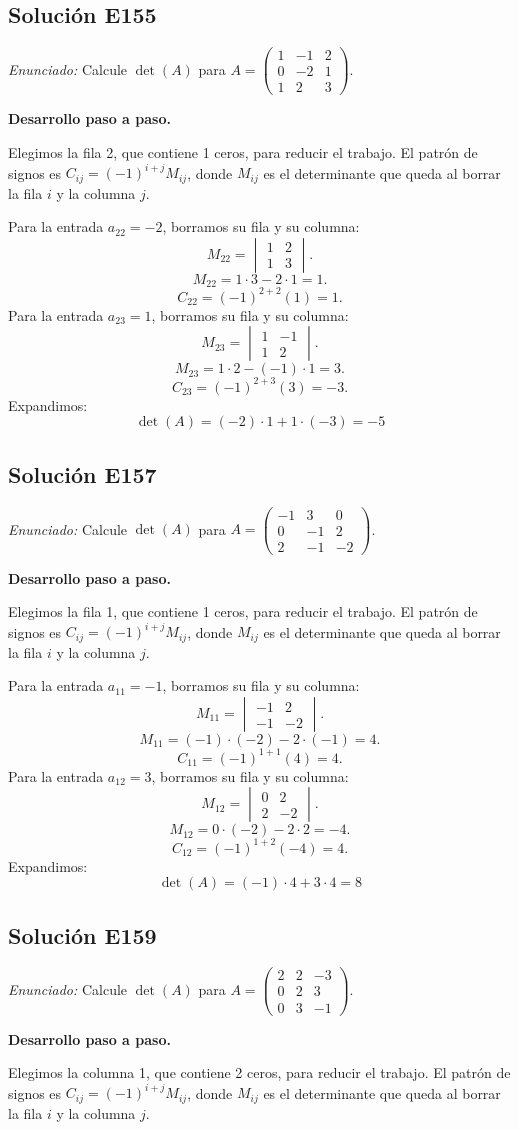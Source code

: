 \documentclass[12pt]{article}
\theoremstyle{remark}
\newcommand{\solucion}[2]{\Needspace{11\baselineskip}\subsection*{Solución E#1}\noindent\textit{Enunciado:} #2\par\medskip\noindent\textbf{Desarrollo paso a paso.}\par\medskip}
\begin{document}
\medskip

\solucion{155}{Calcule $\det(A)$ para $A=\begin{pmatrix}1&-1&2\\0&-2&1\\1&2&3\end{pmatrix}$.}
Elegimos la fila 2, que contiene 1 ceros, para reducir el trabajo. El patrón de signos es $C_{ij}=(-1)^{i+j}M_{ij}$, donde $M_{ij}$ es el determinante que queda al borrar la fila $i$ y la columna $j$.

Para la entrada $a_{22}=-2$, borramos su fila y su columna:
\[
M_{22}=\begin{vmatrix}1&2\\1&3\end{vmatrix}.
\]
\[
M_{22}=1\cdot 3-2\cdot 1=1.
\]
\[
C_{22}=(-1)^{2+2}(1)=1.
\]
Para la entrada $a_{23}=1$, borramos su fila y su columna:
\[
M_{23}=\begin{vmatrix}1&-1\\1&2\end{vmatrix}.
\]
\[
M_{23}=1\cdot 2-(-1)\cdot 1=3.
\]
\[
C_{23}=(-1)^{2+3}(3)=-3.
\]
Expandimos: \[
\boxed{\det(A)=(-2)\cdot 1 + 1\cdot (-3)=-5}
\]

\medskip

\solucion{157}{Calcule $\det(A)$ para $A=\begin{pmatrix}-1&3&0\\0&-1&2\\2&-1&-2\end{pmatrix}$.}
Elegimos la fila 1, que contiene 1 ceros, para reducir el trabajo. El patrón de signos es $C_{ij}=(-1)^{i+j}M_{ij}$, donde $M_{ij}$ es el determinante que queda al borrar la fila $i$ y la columna $j$.

Para la entrada $a_{11}=-1$, borramos su fila y su columna:
\[
M_{11}=\begin{vmatrix}-1&2\\-1&-2\end{vmatrix}.
\]
\[
M_{11}=(-1)\cdot (-2)-2\cdot (-1)=4.
\]
\[
C_{11}=(-1)^{1+1}(4)=4.
\]
Para la entrada $a_{12}=3$, borramos su fila y su columna:
\[
M_{12}=\begin{vmatrix}0&2\\2&-2\end{vmatrix}.
\]
\[
M_{12}=0\cdot (-2)-2\cdot 2=-4.
\]
\[
C_{12}=(-1)^{1+2}(-4)=4.
\]
Expandimos: \[
\boxed{\det(A)=(-1)\cdot 4 + 3\cdot 4=8}
\]

\medskip

\solucion{159}{Calcule $\det(A)$ para $A=\begin{pmatrix}2&2&-3\\0&2&3\\0&3&-1\end{pmatrix}$.}
Elegimos la columna 1, que contiene 2 ceros, para reducir el trabajo. El patrón de signos es $C_{ij}=(-1)^{i+j}M_{ij}$, donde $M_{ij}$ es el determinante que queda al borrar la fila $i$ y la columna $j$.
\end{document}
